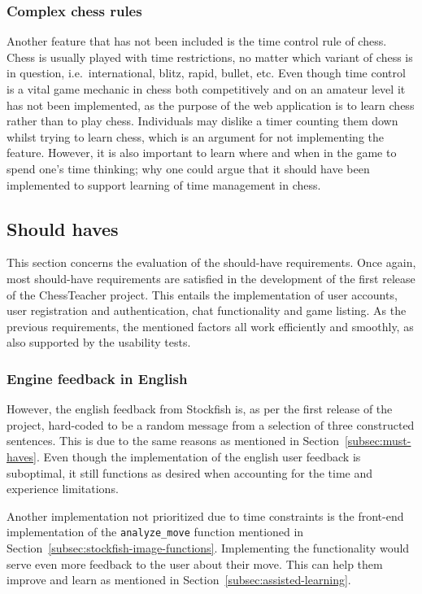 
\subsubsection{Complex chess rules}

Another feature that has not been included is the time control rule of chess.
Chess is usually played with time restrictions, no matter which variant of chess is in question, i.e.\ international,
blitz, rapid, bullet, etc.
Even though time control is a vital game mechanic in chess both competitively and on an amateur level it has not been
implemented, as the purpose of the web application is to learn chess rather than to play chess.
Individuals may dislike a timer counting them down whilst trying to learn chess, which is an argument for not
implementing the feature.
However, it is also important to learn where and when in the game to spend one's time thinking; why one could argue that
it should have been implemented to support learning of time management in chess.


\subsection{Should haves}\label{subsec:should-haves}

This section concerns the evaluation of the should-have requirements.
Once again, most should-have requirements are satisfied in the development of the first release of the ChessTeacher
project.
This entails the implementation of user accounts, user registration and authentication, chat functionality and game
listing.
As the previous requirements, the mentioned factors all work efficiently and smoothly,
as also supported by the usability tests.


\subsubsection{Engine feedback in English}

However, the english feedback from Stockfish is, as per the first release of the project, hard-coded to be a random
message from a selection of three constructed sentences.
This is due to the same reasons as mentioned in Section~\ref{subsec:must-haves}.
Even though the implementation of the english user feedback is suboptimal, it still functions as desired when accounting
for the time and experience limitations.

Another implementation not prioritized due to time constraints is the front-end implementation of the
\verb|analyze_move| function mentioned in Section~\ref{subsec:stockfish-image-functions}.
Implementing the functionality would serve even more feedback to the user about their move.
This can help them improve and learn as mentioned in Section~\ref{subsec:assisted-learning}.
